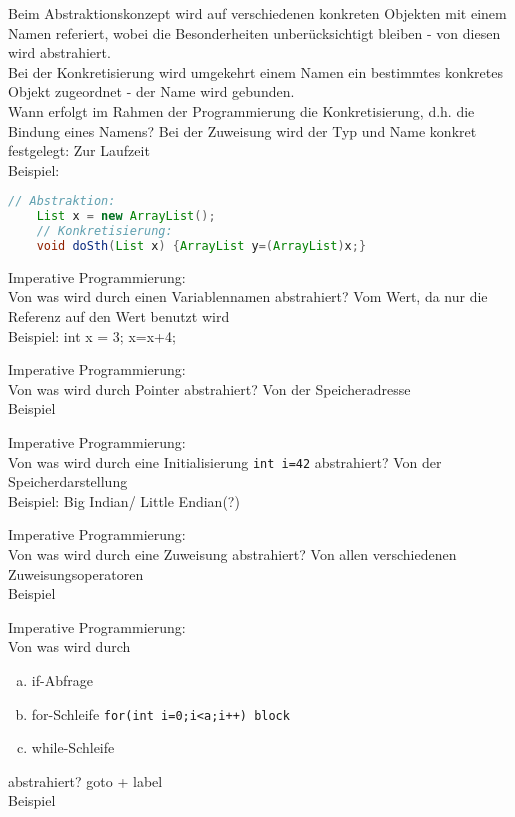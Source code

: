 \begin{card}
	Beim Abstraktionskonzept wird auf verschiedenen konkreten Objekten mit einem Namen referiert, wobei die Besonderheiten unberücksichtigt bleiben - von diesen wird abstrahiert.\\
	Bei der Konkretisierung wird umgekehrt einem Namen ein bestimmtes konkretes Objekt zugeordnet - der Name wird gebunden.\\
	Wann erfolgt im Rahmen der Programmierung die Konkretisierung, d.h. die Bindung	eines Namens?
	\hr
	Bei der Zuweisung wird der Typ und Name konkret festgelegt: Zur Laufzeit\\
	Beispiel:
	\begin{lstlisting}[language=Java]
	// Abstraktion:
	List x = new ArrayList();
	// Konkretisierung:
	void doSth(List x) {ArrayList y=(ArrayList)x;}
	\end{lstlisting}
\end{card}

\begin{card}
	Imperative Programmierung:\\
	Von was wird durch einen Variablennamen abstrahiert?
	\hr
	Vom Wert, da nur die Referenz auf den Wert benutzt wird\\
		Beispiel: int x = 3; x=x+4;
\end{card}

\begin{card}
	Imperative Programmierung:\\
	Von was wird durch Pointer abstrahiert?
	\hr
	Von der Speicheradresse\\
		Beispiel
\end{card}

\begin{card}
	Imperative Programmierung:\\
	Von was wird durch eine Initialisierung \texttt{int i=42} abstrahiert?
	\hr
	Von der Speicherdarstellung	\\
	Beispiel: Big Indian/ Little Endian(?)
\end{card}

\begin{card}
	Imperative Programmierung:\\
	Von was wird durch eine Zuweisung abstrahiert?
	\hr
	Von allen verschiedenen Zuweisungsoperatoren\\
		Beispiel
\end{card}

\begin{card}
	Imperative Programmierung:\\
	Von was wird durch 
	\begin{enumerate}[a)]
	\item if-Abfrage
	\item for-Schleife \texttt{for(int i=0;i<a;i++) block} 
	\item while-Schleife
	\end{enumerate}
	abstrahiert?
	\hr
	goto + label\\
	Beispiel
\end{card}

